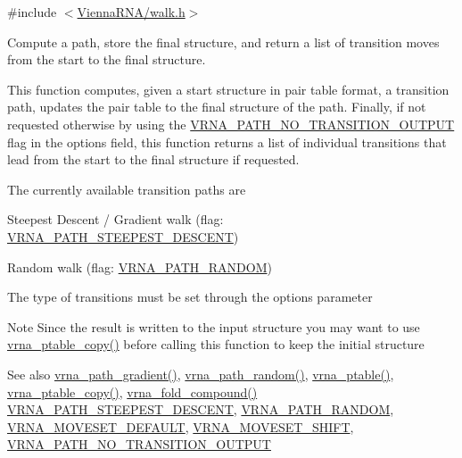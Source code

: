 {\ttfamily \#include $<$\mbox{\hyperlink{walk_8h}{Vienna\+R\+N\+A/walk.\+h}}$>$}



Compute a path, store the final structure, and return a list of transition moves from the start to the final structure. 

This function computes, given a start structure in pair table format, a transition path, updates the pair table to the final structure of the path. Finally, if not requested otherwise by using the \mbox{\hyperlink{group__paths_ga1ee63e54ecf136491e12ff03ede2622d}{V\+R\+N\+A\+\_\+\+P\+A\+T\+H\+\_\+\+N\+O\+\_\+\+T\+R\+A\+N\+S\+I\+T\+I\+O\+N\+\_\+\+O\+U\+T\+P\+UT}} flag in the {\ttfamily options} field, this function returns a list of individual transitions that lead from the start to the final structure if requested.

The currently available transition paths are
\begin{DoxyItemize}
\item Steepest Descent / Gradient walk (flag\+: \mbox{\hyperlink{group__paths_ga705cea2b3243a38a2d6e3b1e141ed061}{V\+R\+N\+A\+\_\+\+P\+A\+T\+H\+\_\+\+S\+T\+E\+E\+P\+E\+S\+T\+\_\+\+D\+E\+S\+C\+E\+NT}})
\item Random walk (flag\+: \mbox{\hyperlink{group__paths_ga0b84bd36bfd783130297797c51dd85ae}{V\+R\+N\+A\+\_\+\+P\+A\+T\+H\+\_\+\+R\+A\+N\+D\+OM}})
\end{DoxyItemize}

The type of transitions must be set through the {\ttfamily options} parameter

\begin{DoxyNote}{Note}
Since the result is written to the input structure you may want to use \mbox{\hyperlink{group__struct__utils_ga2daefbbd6d9f8803731651882f54332d}{vrna\+\_\+ptable\+\_\+copy()}} before calling this function to keep the initial structure
\end{DoxyNote}
\begin{DoxySeeAlso}{See also}
\mbox{\hyperlink{group__paths_gae92cce443a8a64f7b7fb89867b7d6125}{vrna\+\_\+path\+\_\+gradient()}}, \mbox{\hyperlink{group__paths_ga9234756c337078fa599529d3db70d913}{vrna\+\_\+path\+\_\+random()}}, \mbox{\hyperlink{group__struct__utils_gae829fb8bb7f694c12a9c0bbc34c77c60}{vrna\+\_\+ptable()}}, \mbox{\hyperlink{group__struct__utils_ga2daefbbd6d9f8803731651882f54332d}{vrna\+\_\+ptable\+\_\+copy()}}, \mbox{\hyperlink{group__fold__compound_ga6601d994ba32b11511b36f68b08403be}{vrna\+\_\+fold\+\_\+compound()}} \mbox{\hyperlink{group__paths_ga705cea2b3243a38a2d6e3b1e141ed061}{V\+R\+N\+A\+\_\+\+P\+A\+T\+H\+\_\+\+S\+T\+E\+E\+P\+E\+S\+T\+\_\+\+D\+E\+S\+C\+E\+NT}}, \mbox{\hyperlink{group__paths_ga0b84bd36bfd783130297797c51dd85ae}{V\+R\+N\+A\+\_\+\+P\+A\+T\+H\+\_\+\+R\+A\+N\+D\+OM}}, \mbox{\hyperlink{group__neighbors_gaa5ffec4dd0d02df320f123e6888154d1}{V\+R\+N\+A\+\_\+\+M\+O\+V\+E\+S\+E\+T\+\_\+\+D\+E\+F\+A\+U\+LT}}, \mbox{\hyperlink{group__neighbors_ga68ea27c81de4b74e48b775c04052590b}{V\+R\+N\+A\+\_\+\+M\+O\+V\+E\+S\+E\+T\+\_\+\+S\+H\+I\+FT}}, \mbox{\hyperlink{group__paths_ga1ee63e54ecf136491e12ff03ede2622d}{V\+R\+N\+A\+\_\+\+P\+A\+T\+H\+\_\+\+N\+O\+\_\+\+T\+R\+A\+N\+S\+I\+T\+I\+O\+N\+\_\+\+O\+U\+T\+P\+UT}}
\end{DoxySeeAlso}


